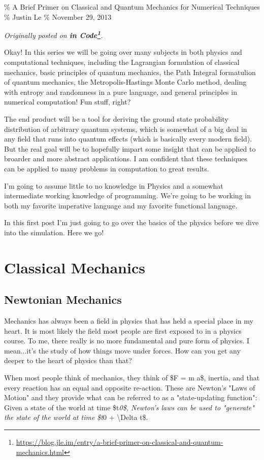 \documentclass[]{article}
\renewcommand{\href}[2]{#2\footnote{\url{#1}}}
\begin{document}
\% A Brief Primer on Classical and Quantum Mechanics for Numerical Techniques \%
Justin Le \% November 29, 2013

\emph{Originally posted on
\textbf{\href{https://blog.jle.im/entry/a-brief-primer-on-classical-and-quantum-mechanics.html}{in
Code}}.}

Okay! In this series we will be going over many subjects in both physics and
computational techniques, including the Lagrangian formulation of classical
mechanics, basic principles of quantum mechanics, the Path Integral formatulion
of quantum mechanics, the Metropolis-Hastings Monte Carlo method, dealing with
entropy and randomness in a pure language, and general principles in numerical
computation! Fun stuff, right?

The end product will be a tool for deriving the ground state probability
distribution of arbitrary quantum systems, which is somewhat of a big deal in
any field that runs into quantum effects (which is basically every modern
field). But the real goal will be to hopefully impart some insight that can be
applied to broarder and more abstract applications. I am confident that these
techniques can be applied to many problems in computation to great results.

I'm going to assume little to no knowledge in Physics and a somewhat
intermediate working knowledge of programming. We're going to be working in both
my favorite imperative language and my favorite functional language.

In this first post I'm just going to go over the basics of the physics before we
dive into the simulation. Here we go!

\section{Classical Mechanics}

\subsection{Newtonian Mechanics}

Mechanics has always been a field in physics that has held a special place in my
heart. It is most likely the field most people are first exposed to in a physics
course. To me, there really is no more fundamental and pure form of physics. I
mean...it's the study of how things move under forces. How can you get any
deeper to the heart of physics than that?

When most people think of mechanics, they think of \$F = m a\$, inertia, and
that every reaction has an equal and opposite re-action. These are Newton's
"Laws of Motion" and they provide what can be referred to as a "state-updating
function": Given a state of the world at time \$t\emph{0\$, Newton's laws can be
used to "generate" the state of the world at time \$t}0 + \textbackslash{}Delta
t\$.
\end{document}
